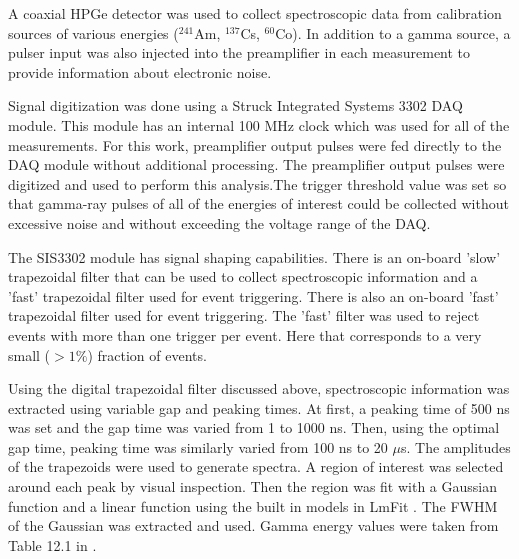 A coaxial HPGe detector was used to collect spectroscopic data from calibration sources of various energies (${}^{241}$Am, ${}^{137}$Cs, ${}^{60}$Co). In addition to a gamma source, a pulser input was also injected into the preamplifier in each measurement to provide information about electronic noise. 

Signal digitization was done using a Struck Integrated Systems 3302 DAQ module. This module has an internal 100 MHz clock which was used for all of the measurements. For this work, preamplifier output pulses were fed directly to the DAQ module without additional processing. The preamplifier output pulses were digitized and used to perform this analysis.The trigger threshold value was set so that gamma-ray pulses of all of the energies of interest could be collected without excessive noise and without exceeding the voltage range of the DAQ.

The SIS3302 module has signal shaping capabilities. There is an on-board 'slow' trapezoidal filter that can be used to collect spectroscopic information and a 'fast' trapezoidal filter used for event triggering. There is also an on-board 'fast' trapezoidal filter used for event triggering. The 'fast' filter was used to reject events with more than one trigger per event. Here that corresponds to a very small ($>1\%$) fraction of events.

Using the digital trapezoidal filter discussed above, spectroscopic information was extracted using variable gap and peaking times. At first, a peaking time of 500 ns was set and the gap time was varied from 1 to 1000 ns. Then, using the optimal gap time, peaking time was similarly varied from 100 ns to 20 $\mu$s. The amplitudes of the trapezoids were used to generate spectra. A region of interest was selected around each peak by visual inspection. Then the region was fit with a Gaussian function and a linear function using the built in models in LmFit \cite{LMFIT}. The FWHM of the Gaussian was extracted and used. Gamma energy values were taken from Table 12.1 in \cite{Knoll} .